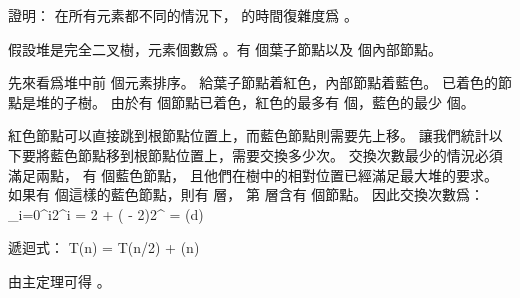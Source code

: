 \startEXERCISE\DIFFICULT
證明： 在所有元素都不同的情況下，  的時間復雜度爲 。
\stopEXERCISE

\startANSWER
假設堆是完全二叉樹，元素個數爲 。有  個葉子節點以及  個內部節點。

先來看爲堆中前  個元素排序。
給葉子節點着紅色，內部節點着藍色。
已着色的節點是堆的子樹。
由於有  個節點已着色，紅色的最多有  個，藍色的最少  個。

紅色節點可以直接跳到根節點位置上，而藍色節點則需要先上移。
讓我們統計以下要將藍色節點移到根節點位置上，需要交換多少次。
交換次數最少的情況必須滿足兩點，
有  個藍色節點，
且他們在樹中的相對位置已經滿足最大堆的要求。
如果有  個這樣的藍色節點，則有  層，
第  層含有  個節點。
因此交換次數爲：
\startformula
\sum_{i=0}^{}i2^i = 2 + ( - 2)2^{} = \Omega(d)
\stopformula

遞迴式：
\startformula
T(n) = T(n/2) + \Omega(n)
\stopformula

由主定理可得 。
\stopANSWER

\stopsection
